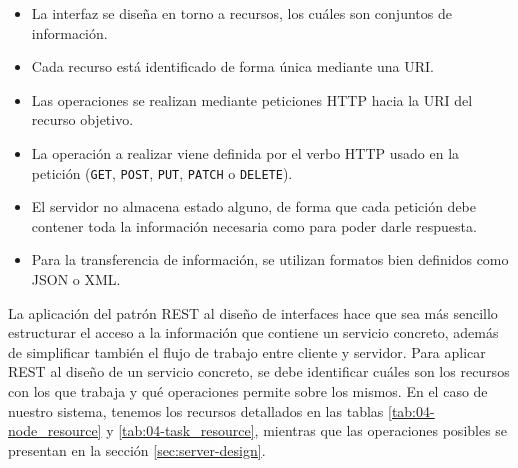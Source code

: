 \begin{itemize}
    \item La interfaz se diseña en torno a recursos, los cuáles son conjuntos de
          información.
    \item Cada recurso está identificado de forma única mediante una URI.
    \item Las operaciones se realizan mediante peticiones HTTP hacia la URI del
          recurso objetivo.
    \item La operación a realizar viene definida por el verbo HTTP usado en la
          petición (\texttt{GET}, \texttt{POST}, \texttt{PUT}, \texttt{PATCH} o
          \texttt{DELETE}).
    \item El servidor no almacena estado alguno, de forma que cada petición debe
          contener toda la información necesaria como para poder darle respuesta.
    \item Para la transferencia de información, se utilizan formatos bien
          definidos como JSON o XML.
\end{itemize}

La aplicación del patrón REST al diseño de interfaces hace que sea más sencillo
estructurar el acceso a la información que contiene un servicio concreto, además
de simplificar también el flujo de trabajo entre cliente y servidor. Para
aplicar REST al diseño de un servicio concreto, se debe identificar cuáles son
los recursos con los que trabaja y qué operaciones permite sobre los mismos. En
el caso de nuestro sistema, tenemos los recursos detallados en las tablas
\ref{tab:04-node_resource} y \ref{tab:04-task_resource}, mientras que las
operaciones posibles se presentan en la sección \ref{sec:server-design}.


